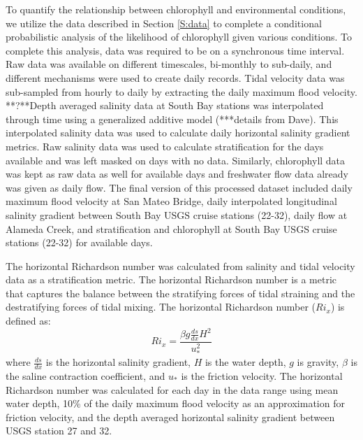 \documentclass[preprint,review,12pt]{elsarticle}
\begin{document}
To quantify the relationship between chlorophyll and environmental conditions, we utilize the data described in Section \ref{S:data} to complete a conditional probabilistic analysis of the likelihood of chlorophyll given various conditions. To complete this analysis, data was required to be on a synchronous time interval. Raw data was available on different timescales, bi-monthly to sub-daily, and different mechanisms were used to create daily records. Tidal velocity data was sub-sampled from hourly to daily by extracting the daily maximum flood velocity. **?**Depth averaged salinity data at South Bay stations was interpolated through time using a generalized additive model (***details from Dave). This interpolated salinity data was used to calculate daily horizontal salinity gradient metrics. Raw salinity data was used to calculate stratification for the days available and was left masked on days with no data. Similarly, chlorophyll data was kept as raw data as well for available days and freshwater flow data already was given as daily flow. The final version of this processed dataset included daily maximum flood velocity at San Mateo Bridge, daily interpolated longitudinal salinity gradient between South Bay USGS cruise stations (22-32), daily flow at Alameda Creek, and stratification and chlorophyll at South Bay USGS cruise stations (22-32) for available days. 

The horizontal Richardson number was calculated from salinity and tidal velocity data as a stratification metric. The horizontal Richardson number is a metric that captures the balance between the stratifying forces of tidal straining and the destratifying forces of tidal mixing. The horizontal Richardson number (\(Ri_x\)) is defined as:
\begin{equation}
    Ri_x = \frac{\beta g \frac{ds}{dx} H^2}{u_*^2}
\end{equation}
where \(\frac{ds}{dx}\) is the horizontal salinity gradient, \(H\) is the water depth, \(g\) is gravity, \(\beta\) is the saline contraction coefficient, and \(u_*\) is the friction velocity. The horizontal Richardson number was calculated for each day in the data range using mean water depth, 10\% of the daily maximum flood velocity as an approximation for friction velocity, and the depth averaged horizontal salinity gradient between USGS station 27 and 32. 
\end{document}

